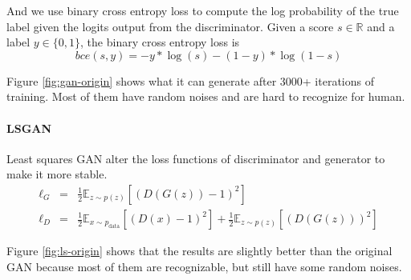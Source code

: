 \documentclass{article} %
\begin{document}
And we use binary cross entropy loss to compute the log probability of the true label given the logits output from the discriminator. Given a score $s\in\mathbb{R}$ and a label $y\in\{0, 1\}$, the binary cross entropy loss is
$$ bce(s, y) = -y * \log(s) - (1 - y) * \log(1 - s) $$

Figure \ref{fig:gan-origin} shows what it can generate after 3000+ iterations of training. Most of them have random noises and are hard to recognize for human.

\paragraph{LSGAN} Least squares GAN alter the loss functions of discriminator and generator to make it more stable. 
\begin{eqnarray*}
\ell_G &=&  \frac{1}{2}\mathbb{E}_{z \sim p(z)}\left[\left(D(G(z))-1\right)^2\right]\\
\ell_D &=& \frac{1}{2}\mathbb{E}_{x \sim p_\text{data}}\left[\left(D(x)-1\right)^2\right] + \frac{1}{2}\mathbb{E}_{z \sim p(z)}\left[ \left(D(G(z))\right)^2\right]
\end{eqnarray*}

Figure \ref{fig:ls-origin} shows that the results are slightly better than the original GAN because most of them are recognizable, but still have some random noises.
\end{document}
